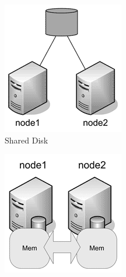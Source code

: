 \begin{figure}[h]
	\centering
	\begin{subfigure}[b]{0.2\textwidth}
		\includegraphics[width=\textwidth]{7/07_01.png}
		\caption{Shared Disk}
	\end{subfigure}
	\hfill
	\begin{subfigure}[b]{0.2\textwidth}
		\includegraphics[width=\textwidth]{7/07_02.png}

\end{subfigure}
\end{figure}
